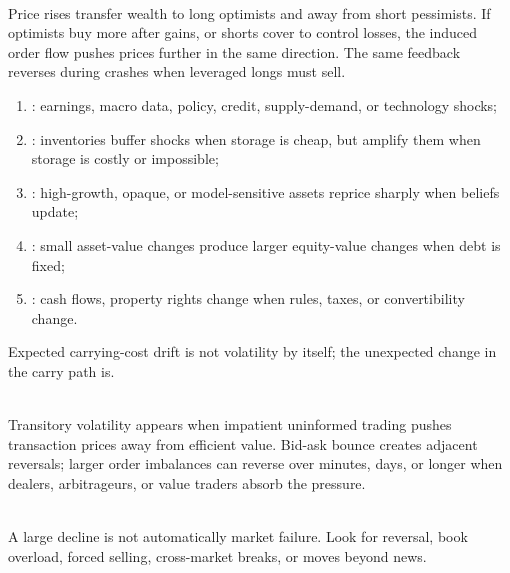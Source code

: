 \begin{mechanism} \\
Price rises transfer wealth to long optimists and away from short pessimists. If optimists buy more after gains, or shorts cover to control losses, the induced order flow pushes prices further in the same direction. The same feedback reverses during crashes when leveraged longs must sell.
\end{mechanism}

\begin{taxonomy} 
\begin{enumerate}[label=\roman*.]
\setlength{\itemsep}{0pt}
\item {}: earnings, macro data, policy, credit, supply-demand, or technology shocks;
\item {}: inventories buffer shocks when storage is cheap, but amplify them when storage is costly or impossible;
\item {}: high-growth, opaque, or model-sensitive assets reprice sharply when beliefs update;
\item {}: small asset-value changes produce larger equity-value changes when debt is fixed;
\item {}: cash flows, property rights change when rules, taxes, or convertibility change.
\end{enumerate}
Expected carrying-cost drift is not volatility by itself; the unexpected change in the carry path is.
\end{taxonomy}

\begin{mechanism} \\
Transitory volatility appears when impatient uninformed trading pushes transaction prices away from efficient value. Bid-ask bounce creates adjacent reversals; larger order imbalances can reverse over minutes, days, or longer when dealers, arbitrageurs, or value traders absorb the pressure.
\end{mechanism}

\begin{caveat} \\
A large decline is not automatically market failure. Look for reversal, book overload, forced selling, cross-market breaks, or moves beyond news.
\end{caveat}

